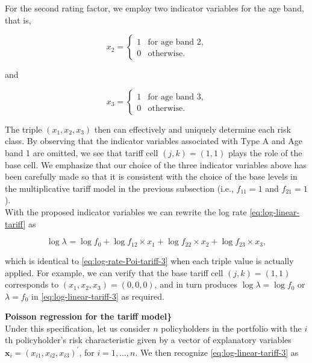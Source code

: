\documentclass[]{book}
\theoremstyle{definition}
\theoremstyle{definition}
\theoremstyle{definition}
\theoremstyle{remark}
\begin{document}
For the second rating factor, we employ two indicator variables for the
age band, that is,

\begin{equation}
x_2=
\begin{cases}
     1 & \text{for age band 2}, \\
     0 & \text{otherwise}.
\end{cases}
\end{equation}

and

\begin{equation}
x_3=
\begin{cases}
     1 & \text{for age band 3}, \\
     0 & \text{otherwise}.
\end{cases}
\end{equation}

The triple \((x_1, x_2, x_3)\) then can effectively and uniquely
determine each risk class. By observing that the indicator variables
associated with Type A and Age band 1 are omitted, we see that tariff
cell \((j,k)=(1,1)\) plays the role of the base cell. We emphasize that
our choice of the three indicator variables above has been carefully
made so that it is consistent with the choice of the base levels in the
multiplicative tariff model in the previous subsection (i.e.,
\(f_{11}=1\) and \(f_{21}=1\)).\\

With the proposed indicator variables we can rewrite the log rate
\eqref{eq:log-linear-tariff} as

\begin{equation}
\log \lambda_{}= \log f_0+ \log f_{12}  \times x_1 + \log f_{22} \times x_2 +\log f_{23} \times x_3,
\label{eq:log-linear-tariff-3}
\end{equation}

which is identical to \eqref{eq:log-rate-Poi-tariff-3} when each triple
value is actually applied. For example, we can verify that the base
tariff cell \((j,k)=(1,1)\) corresponds to \((x_1, x_2,x_3)=(0, 0, 0)\),
and in turn produces \(\log \lambda=\log f_0\) or \(\lambda= f_0\) in
\eqref{eq:log-linear-tariff-3} as required.

\textbf{Poisson regression for the tariff model\}}\\
Under this specification, let us consider \(n\) policyholders in the
portfolio with the \(i\)th policyholder's risk characteristic given by a
vector of explanatory variables
\(\mathbf{ x}_i=(x_{i1}, x_{i2},x_{i3})^{\prime}\), for
\(i=1, \ldots, n\). We then recognize \eqref{eq:log-linear-tariff-3} as
\end{document}
